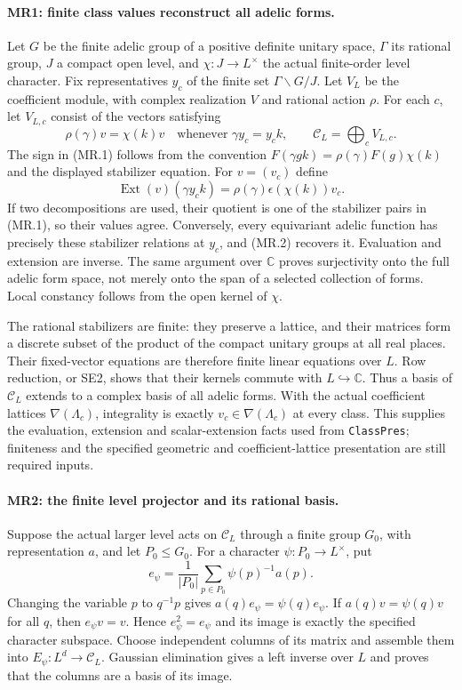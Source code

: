 \paragraph{MR1: finite class values reconstruct all adelic forms.}
Let $G$ be the finite adelic group of a positive definite unitary
space, $\Gamma$ its rational group, $J$ a compact open level, and
$\chi:J\to L^\times$ the actual finite-order level character. Fix
representatives $y_c$ of the finite set $\Gamma\backslash G/J$.
Let $V_L$ be the coefficient module, with complex realization $V$ and
rational action $\rho$. For each $c$, let $V_{L,c}$ consist of the
vectors satisfying
\[
 \rho(\gamma)v=\chi(k)v
 \quad\text{whenever }\gamma y_c=y_c k,
 \qquad \mathcal C_L=\bigoplus_c V_{L,c}.             \tag{MR.1}
\]
The sign in (MR.1) follows from the convention
$F(\gamma gk)=\rho(\gamma)F(g)\chi(k)$ and the displayed
stabilizer equation.
For $v=(v_c)$ define
\[
       \operatorname{Ext}(v)(\gamma y_c k)
          =\rho(\gamma)\epsilon(\chi(k))v_c.          \tag{MR.2}
\]
If two decompositions are used, their quotient is one of the
stabilizer pairs in (MR.1), so their values agree. Conversely, every
equivariant adelic function has precisely these stabilizer relations
at $y_c$, and (MR.2) recovers it. Evaluation and extension are inverse.
The same argument over $\mathbb C$ proves surjectivity onto the full
adelic form space, not merely onto the span of a selected collection
of forms. Local constancy follows from the open kernel of $\chi$.

The rational stabilizers are finite: they preserve a lattice, and
their matrices form a discrete subset of the product of the compact
unitary groups at all real places. Their fixed-vector equations are therefore finite linear
equations over $L$. Row reduction, or SE2, shows that their kernels
commute with $L\hookrightarrow\mathbb C$. Thus a basis of
$\mathcal C_L$ extends to a complex basis of all adelic forms.
With the actual coefficient lattices $\nabla(\Lambda_c)$, integrality
is exactly $v_c\in\nabla(\Lambda_c)$ at every class. This supplies the
evaluation, extension and scalar-extension facts used from
\texttt{ClassPres}; finiteness and the specified geometric and
coefficient-lattice presentation are still required inputs.

\paragraph{MR2: the finite level projector and its rational basis.}
Suppose the actual larger level acts on $\mathcal C_L$ through a
finite group $G_0$, with representation $a$, and let $P_0\le G_0$.
For a character $\psi:P_0\to L^\times$, put
\[
 e_\psi=\frac1{|P_0|}\sum_{p\in P_0}\psi(p)^{-1}a(p).
                                                               \tag{MR.3}
\]
Changing the variable $p$ to $q^{-1}p$ gives
$a(q)e_\psi=\psi(q)e_\psi$. If $a(q)v=\psi(q)v$ for all $q$, then
$e_\psi v=v$. Hence $e_\psi^2=e_\psi$ and its image is exactly the
specified character subspace. Choose independent columns of its
matrix and assemble them into $E_\psi:L^d\to\mathcal C_L$.
Gaussian elimination gives a left inverse over $L$ and proves that
the columns are a basis of its image.


